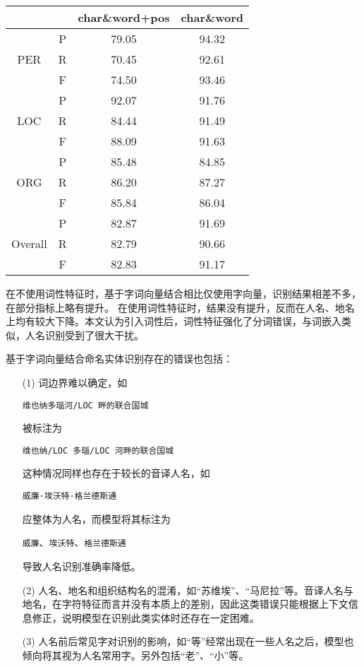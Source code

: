 \begin{table}[H]
    \centering
    \begin{tabular}{cccc}
        \toprule
        && char\&word+pos & char\&word\\
        \midrule
        \multirow{3}{*}{PER} & P & 79.05 & 94.32\\
        & R & 70.45 & 92.61\\
        & F & 74.50 & 93.46\\
        \midrule
        \multirow{3}{*}{LOC} & P & 92.07 & 91.76\\
        & R & 84.44 & 91.49\\
        & F & 88.09 & 91.63\\
        \midrule
        \multirow{3}{*}{ORG} & P & 85.48 & 84.85\\
        & R & 86.20 & 87.27\\
        & F & 85.84 & 86.04\\
        \midrule
        \multirow{3}{*}{Overall} & P & 82.87 & 91.69\\
        & R & 82.79 & 90.66\\
        & F & 82.83  & 91.17\\
        \bottomrule
    \end{tabular}
    \label{tab:word_char_comparison}
\end{table}
在不使用词性特征时，基于字词向量结合相比仅使用字向量，识别结果相差不多，在部分指标上略有提升。
在使用词性特征时，结果没有提升，反而在人名、地名上均有较大下降。本文认为引入词性后，词性特征强化了分词错误，与词嵌入类似，人名识别受到了很大干扰。

基于字词向量结合命名实体识别存在的错误也包括：
\begin{enumerate}[leftmargin=*]
    \item[(1)] 词边界难以确定，如
        \begin{center}
            \verb|维也纳多瑙河/LOC 畔的联合国城|
        \end{center}
        被标注为
        \begin{center}
            \verb|维也纳/LOC 多瑙/LOC 河畔的联合国城|
        \end{center}
        这种情况同样也存在于较长的音译人名，如
        \begin{center}
            \verb|威廉·埃沃特·格兰德斯通|
        \end{center}
        应整体为人名，而模型将其标注为
        \begin{center}
            \verb|威廉|、\verb|埃沃特|、\verb|格兰德斯通|
        \end{center}
        导致人名识别准确率降低。
    \item[(2)] 人名、地名和组织结构名的混淆，如“苏维埃”、“马尼拉”等。音译人名与地名，在字符特征而言并没有本质上的差别，因此这类错误只能根据上下文信息修正，说明模型在识别此类实体时还存在一定困难。
    \item[(3)] 人名前后常见字对识别的影响，如“等”经常出现在一些人名之后，模型也倾向将其视为人名常用字。另外包括“老”、“小”等。
\end{enumerate}

